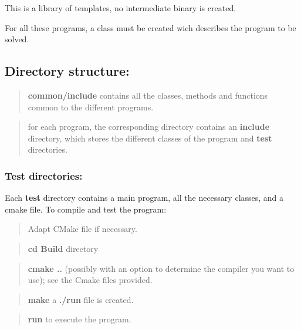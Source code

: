 This is a library of templates, no intermediate binary is created.

For all these programs, a class must be created wich describes the program to be solved.\hypertarget{index_Directory}{}\subsection{Directory structure\-:}\label{index_Directory}
\begin{quotation}
{\bfseries  common/include} contains all the classes, methods and functions common to the different programs.

\end{quotation}


\begin{quotation}
for each program, the corresponding directory contains an {\bfseries include} directory, which stores the different classes of the program and {\bfseries test} directories.

\end{quotation}
\hypertarget{index_test}{}\subsubsection{Test directories\-:}\label{index_test}
Each {\bfseries  test} directory contains a main program, all the necessary classes, and a cmake file. To compile and test the program\-:

\begin{quotation}
Adapt C\-Make file if necessary.

\end{quotation}


\begin{quotation}
{\bfseries cd Build} directory

\end{quotation}


\begin{quotation}
{\bfseries cmake ..} (possibly with an option to determine the compiler you want to use); see the Cmake files provided.

\end{quotation}


\begin{quotation}
{\bfseries  make} a {\bfseries  ./run } file is created.

\end{quotation}


\begin{quotation}
{\bfseries run} to execute the program. \end{quotation}
